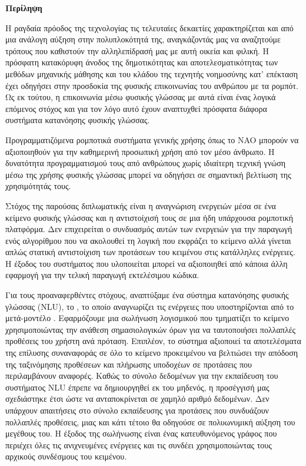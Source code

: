 \begin{center}
    \centering

    \vspace{0.3cm}
    \centering
    \textbf{\Large{Περίληψη}}

    \vspace{0.1cm}
\end{center}

Η ραγδαία πρόοδος της τεχνολογίας τις τελευταίες δεκαετίες χαρακτηρίζεται και από μια ανάλογη αύξηση στην πολυπλοκότητά της,
αναγκάζοντάς μας να αναζητούμε τρόπους που καθιστούν την αλληλεπίδρασή μας με αυτή οικεία και φιλική.
Η πρόσφατη κατακόρυφη άνοδος της δημοτικότητας και αποτελεσματικότητας των μεθόδων μηχανικής μάθησης
και του κλάδου της τεχνητής νοημοσύνης κατ' επέκταση
έχει οδηγήσει στην προσδοκία της φυσικής επικοινωνίας του ανθρώπου με τα ρομπότ.
Ως εκ τούτου, η επικοινωνία μέσω φυσικής γλώσσας με αυτά είναι ένας λογικά επόμενος στόχος και για τον λόγο αυτό έχουν αναπτυχθεί πρόσφατα διάφορα συστήματα κατανόησης φυσικής γλώσσας.

Προγραμματιζόμενα ρομποτικά συστήματα γενικής χρήσης όπως το NAO μπορούν να αξιοποιηθούν για την καθημερινή προσωπική χρήση από τον μέσο άνθρωπο.
Η δυνατότητα προγραμματισμού τους από ανθρώπους χωρίς ιδιαίτερη τεχνική γνώση μέσω της χρήσης φυσικής γλώσσας μπορεί να οδηγήσει σε σημαντική βελτίωση της χρησιμότητάς τους.

Στόχος της παρούσας διπλωματικής είναι η αναγνώριση ενεργειών μέσα σε ένα κείμενο φυσικής γλώσσας και η αντιστοίχισή τους σε μια ήδη υπάρχουσα ρομποτική πλατφόρμα.
Δεν επιχειρείται ο συνδυασμός αυτών των ενεργειών για την παραγωγή ενός αλγορίθμου που να ακολουθεί τη λογική που εκφράζει το κείμενο
αλλά γίνεται απλώς στατική αντιστοίχιση των προτάσεων του κειμένου στις κατάλληλες ενέργειες.
Η έξοδος του συστήματος που υλοποιείται μπορεί να αξιοποιηθεί από κάποια άλλη εφαρμογή για την τελική παραγωγή εκτελέσιμου κώδικα.

Για τους προαναφερθέντες στόχους, αναπτύξαμε ένα σύστημα κατανόησης φυσικής γλώσσας (NLU), το \projectname{}, το οποίο αναγνωρίζει τις ενέργειες που υποστηρίζονται από το μετά-μοντέλο \metamodel{}.
Εφαρμόζουμε μια σωλήνωση λογισμικού που τμηματίζει το κείμενο χρησιμοποιώντας την ανάθεση σημασιολογικών όρων για να ταυτοποιήσει πολλαπλές προθέσεις του χρήστη ανά πρόταση.
Επιπλέον, το σύστημα αξιοποιεί τα αποτελέσματα της επίλυσης συναναφοράς σε όλο το κείμενο προκειμένου να βελτιώσει την απόδοση της ταξινόμησης προθέσεων και πλήρωσης υποδοχέων σε προτάσεις που περιλαμβάνουν αναφορές.
Καθώς το σύνολο δεδομένων για την εκπαίδευση του συστήματος NLU έπρεπε να δημιουργηθεί εκ του μηδενός, η προσέγγισή μας σχεδιάστηκε έτσι ώστε να ανταποκρίνεται σε χαμηλό αριθμό δεδομένων.
Δεν υπάρχουν απαιτήσεις στο σύνολο εκπαίδευσης για προτάσεις που συνδυάζουν πολλαπλές προθέσεις, μιας και κάτι τέτοιο θα οδηγούσε σε πολυωνυμική αύξηση του μεγέθους του.
Η έξοδος της σωλήνωσης είναι ένας κατευθυνόμενος γράφος που περιέχει όλες τις ανιχνευμένες ενέργειες και τις συνδέει χρησιμοποιώντας τους αρχικούς συνδέσμους του κειμένου.

